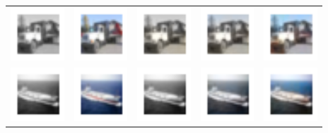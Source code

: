 \documentclass{article}
\begin{document}
\begin{table}[h!]
\begin{tabular}{ccccc}
    \includegraphics[width=2cm]{results3/45-bw.png} & \includegraphics[width=2cm]{results3/45-gt.png} & \includegraphics[width=2cm]{results5/45-relucnn.png} & \includegraphics[width=2cm]{results5/45-tanhcnn.png} & \includegraphics[width=2cm]{results3/45-gan.png} \\
    \includegraphics[width=2cm]{results3/54-bw.png} & \includegraphics[width=2cm]{results3/54-gt.png} & \includegraphics[width=2cm]{results5/54-relucnn.png} & \includegraphics[width=2cm]{results5/54-tanhcnn.png} & \includegraphics[width=2cm]{results3/54-gan.png} \\

\end{tabular}
\end{table}
\end{document}
